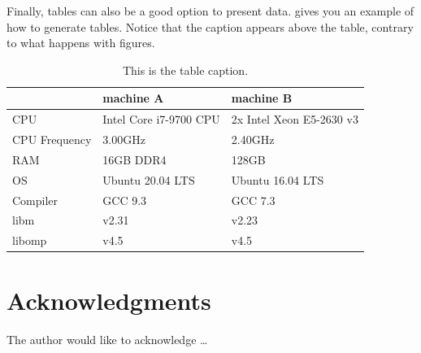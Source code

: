 \documentclass{article}
\begin{document}
Finally, tables can also be a good option to present data.  gives you an example of how to generate tables. Notice that the caption appears above the table, contrary to what happens with figures.

\begin{table}[b]
\caption{This is the table caption.}
\label{tab:table1}
\footnotesize
\begin{tabular}{lll}
\toprule
         & machine A                   & machine B                           \\
\midrule
CPU      & Intel Core i7-9700 CPU      & 2x Intel Xeon E5-2630 v3            \\
CPU Frequency& 3.00GHz                     & 2.40GHz                             \\
RAM      & 16GB DDR4                   & 128GB                               \\
OS       & Ubuntu 20.04 LTS            & Ubuntu 16.04 LTS                    \\
Compiler & GCC 9.3                     & GCC 7.3                             \\
libm     & v2.31                       & v2.23                               \\
libomp   & v4.5                        & v4.5                                \\
\bottomrule
\end{tabular}
\end{table}

\section*{Acknowledgments}
The author would like to acknowledge \ldots

\end{document}
